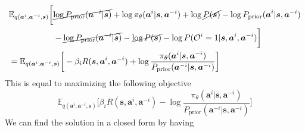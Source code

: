 \begin{equation}
    \begin{aligned}
        &\begin{aligned}
            \mathbb{E}_{q(\boldsymbol{a}^{i}, \boldsymbol{a}^{-i}, \boldsymbol{s})}\bigg[&\cancel{\log P_{\text{prior}}(\boldsymbol{a}^{-i} | \boldsymbol{s})} + \log \pi_{\theta}(\boldsymbol{a}^{i} | \boldsymbol{s}, \boldsymbol{a}^{-i}) + \log \cancel{P(\boldsymbol{s})} - \log P_{\text{prior}}(\boldsymbol{a}^{i} | \boldsymbol{s}, \boldsymbol{a}^{-i}) \\
            &- \cancel{\log P_{\text{prior}}(\boldsymbol{a}^{-i} | \boldsymbol{s})} - \cancel{\log P(\boldsymbol{s})} -\log P(\mathcal{O}^i = 1 | \boldsymbol{s}, \boldsymbol{a}^i, \boldsymbol{a}^{-i}) \bigg]
        \end{aligned} \\ 
        &= \mathbb{E}_{q(\boldsymbol{a}^{i}, \boldsymbol{a}^{-i}, \boldsymbol{s})}\bigg[ -\beta_i R(\boldsymbol{s}, \boldsymbol{a}^i, \boldsymbol{a}^{-i}) + \log \frac{\pi_{\theta}(\boldsymbol{a}^{i} | \boldsymbol{s},\boldsymbol{a}^{-i})}{P_{\text{prior}}(\boldsymbol{a}^{-i} | \boldsymbol{s}, \boldsymbol{a}^{-i})} \bigg] \\ 
    \end{aligned}
\end{equation}
This is equal to maximizing the following objective 
\begin{equation}
    \mathbb{E}_{q(\boldsymbol{a}^{i}, \boldsymbol{a}^{-i}, \boldsymbol{s})}\bigg[\beta_i R(\boldsymbol{s}, \boldsymbol{a}^i, \boldsymbol{a}^{-i}) - \log \frac{\pi_{\theta}(\boldsymbol{a}^{i} | \boldsymbol{s},\boldsymbol{a}^{-i})}{P_{\text{prior}}(\boldsymbol{a}^{-i} | \boldsymbol{s}, \boldsymbol{a}^{-i})} \bigg]
\end{equation}
We can find the solution in a closed form by having 
